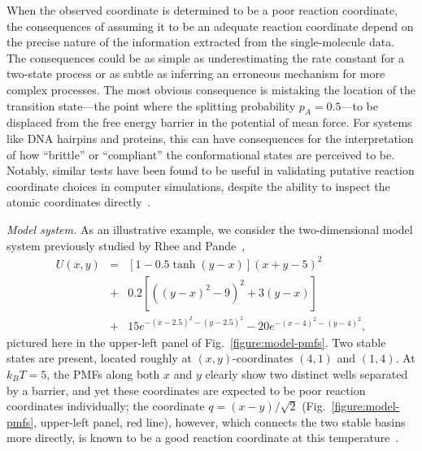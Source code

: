 \documentclass[aps,prl,twocolumn,superscriptaddress,floatfix]{revtex4-1}
\begin{document}
\color{black}
When the observed coordinate is determined to be a poor reaction coordinate, the consequences of assuming it to be an adequate reaction coordinate depend on the precise nature of the information extracted from the single-molecule data.
The consequences could be as simple as underestimating the rate constant for a two-state process or as subtle as inferring an erroneous mechanism for more complex processes.
The most obvious consequence is mistaking the location of the transition state---the point where the splitting probability $p_A = 0.5$---to be displaced from the free energy barrier in the potential of mean force.
For systems like DNA hairpins and proteins, this can have consequences for the interpretation of how ``brittle'' or ``compliant'' the conformational states are perceived to be.
Notably, similar tests have been found to be useful in validating putative reaction coordinate choices in computer simulations, despite the ability to inspect the atomic coordinates directly~\cite{peters:jcp:2007:reaction-coordinate-test,bolhuis:jcp:2010:reaction-coordinate-test}.
\color{black}



\noindent\emph{Model system.}
As an illustrative example, we consider the two-dimensional model system previously studied by Rhee and Pande~\cite{rhee:jpcb:2005:splitting-probability},
\begin{eqnarray}
U(x,y) &=& [1 - 0.5 \tanh (y-x)] (x+y-5)^2 \\
&+& 0.2[((y-x)^2-9)^2+3(y-x)] \nonumber \\
&+& 15 e^{-(x-2.5)^2-(y-2.5)^2} - 20 e^{-(x-4)^2-(y-4)^2} \nonumber ,
\end{eqnarray}
pictured here in the upper-left panel of Fig.~\ref{figure:model-pmfs}.
Two stable states are present, located roughly at $(x,y)$-coordinates $(4,1)$ and $(1,4)$.
At $k_B T = 5$, the PMFs along both $x$ and $y$ clearly show two distinct wells separated by a barrier, and yet these coordinates are expected to be poor reaction coordinates individually; the coordinate $q = (x-y)/\sqrt{2}$ (Fig.~\ref{figure:model-pmfs}, upper-left panel, red line), however, which connects the two stable basins more directly, is known to be a good reaction coordinate at this temperature~\cite{rhee:jpcb:2005:splitting-probability}.
\end{document}
